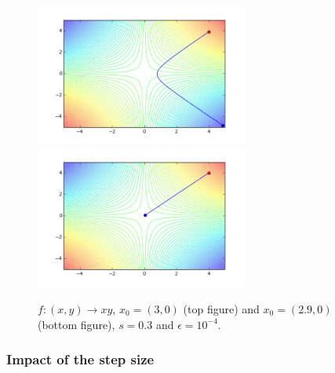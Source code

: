 \begin{figure}[h!]
  \centering
 \includegraphics[width=7cm]{../Figures/Q1/nonconv.png}
  \includegraphics[width=7cm]{../Figures/Q1/nonconv2.png}
\caption{$f : (x,y) \to xy$, $x_0 = (3,0)$ (top figure) and $x_0 = (2.9,0)$(bottom figure), $s = 0.3$ and $\epsilon = 10^{-4}$.}
\label{nonconv}
\end{figure}

\subsubsection{Impact of the step size}

